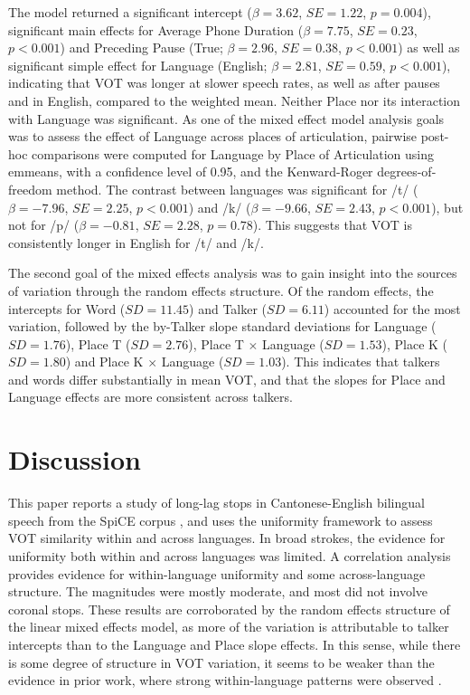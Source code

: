 The model returned a significant intercept ($\beta=3.62$, $SE=1.22$, $p=0.004$), significant main effects for Average Phone Duration ($\beta=7.75$, $SE=0.23$, $p<0.001$) and Preceding Pause (True; $\beta=2.96$, $SE=0.38$, $p<0.001$) as well as significant simple effect for Language (English; $\beta=2.81$, $SE=0.59$, $p<0.001$), indicating that VOT was longer at slower speech rates, as well as after pauses and in English, compared to the weighted mean. Neither Place nor its interaction with Language was significant. As one of the mixed effect model analysis goals was to assess the effect of Language across places of articulation, pairwise post-hoc comparisons were computed for Language by Place of Articulation using emmeans, with a confidence level of 0.95, and the Kenward-Roger degrees-of-freedom method. The contrast between languages was significant for /t/ ($\beta=-7.96$, $SE=2.25$, $p<0.001$) and /k/ ($\beta=-9.66$, $SE=2.43$, $p<0.001$), but not for /p/ ($\beta=-0.81$, $SE=2.28$, $p=0.78$). This suggests that VOT is consistently longer in English for /t/ and /k/.

The second goal of the mixed effects analysis was to gain insight into the sources of variation through the random effects structure. Of the random effects, the intercepts for Word ($SD=11.45$) and Talker ($SD=6.11$) accounted for the most variation, followed by the by-Talker slope standard deviations for Language ($SD=1.76$), Place T ($SD=2.76$), Place T $\times$ Language ($SD=1.53$), Place K ($SD=1.80$) and Place K $\times$ Language ($SD=1.03$). This indicates that talkers and words differ substantially in mean VOT, and that the slopes for Place and Language effects are more consistent across talkers.

\section{Discussion}

This paper reports a study of long-lag stops in Cantonese-English bilingual speech from the SpiCE corpus \citep{johnson_2020_spice}, and uses the uniformity framework to assess VOT similarity within and across languages. In broad strokes, the evidence for uniformity both within and across languages was limited. A correlation analysis provides evidence for within-language uniformity and some across-language structure. The magnitudes were mostly moderate, and most did not involve coronal stops. These results are corroborated by the random effects structure of the linear mixed effects model, as more of the variation is attributable to talker intercepts than to the Language and Place slope effects. In this sense, while there is some degree of structure in VOT variation, it seems to be weaker than the evidence in prior work, where strong within-language patterns were observed \citep{chodroff_2017_structure,chodroff_2019_l2}.

